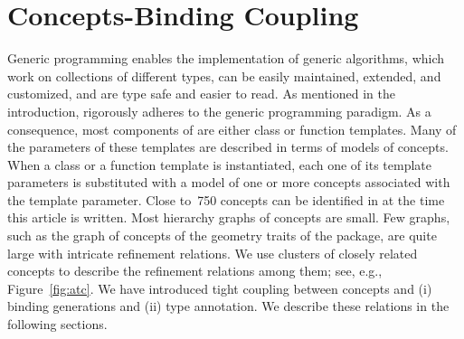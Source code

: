 \section{Concepts-Binding Coupling}
\label{sec:concepts}
Generic programming enables the implementation of generic algorithms,
which work on collections of different types, can be easily
maintained, extended, and customized, and are type safe and easier to
read. As mentioned in the introduction, \cgal{} rigorously adheres to
the generic programming paradigm. As a consequence, most components of
\cgal{} are either class or function templates. Many of the parameters
of these templates are described in terms of models of concepts. When
a class or a function template is instantiated, each one of its
template parameters is substituted with a model of one or more
concepts associated with the template parameter. Close to~750 concepts
can be identified in \cgal{} at the time this article is written. Most
hierarchy graphs of concepts are small. Few graphs, such as the graph
of concepts of the geometry traits of the \iiDArrangementsPackage{}
package, are quite large with intricate refinement relations. We use
clusters of closely related concepts to describe the refinement
relations among them; see, e.g., Figure~\ref{fig:atc}. We have introduced
tight coupling between concepts and (i) binding generations and (ii)
type annotation. We describe these relations in the following sections.


